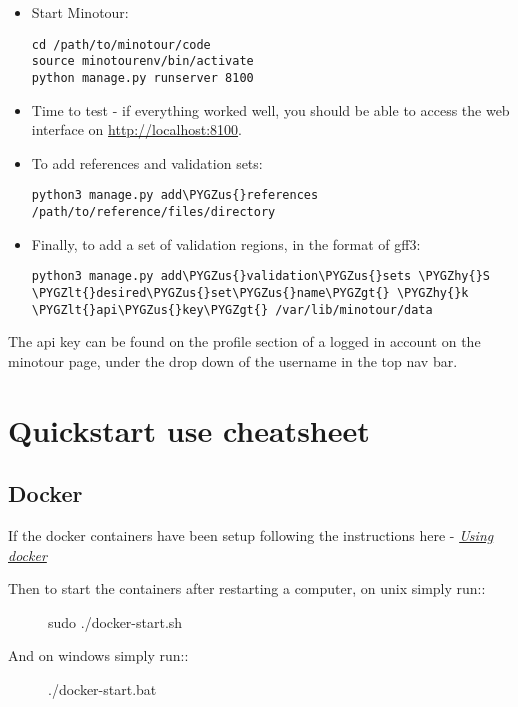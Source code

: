 \documentclass[letterpaper,10pt,english]{sphinxmanual}
\def\PYGZus{\char`\_}
\def\PYGZlt{\char`\<}
\def\PYGZgt{\char`\>}
\def\PYGZhy{\char`\-}
\begin{document}
\begin{itemize}
\item {} 
Start Minotour:

\begin{Verbatim}[commandchars=\\\{\}]
cd /path/to/minotour/code
source minotourenv/bin/activate
python manage.py runserver 8100
\end{Verbatim}

\item {} 
Time to test - if everything worked well, you should be able to access the web interface on \href{http://localhost:8100}{http://localhost:8100}.

\item {} 
To add references and validation sets:

\begin{Verbatim}[commandchars=\\\{\}]
python3 manage.py add\PYGZus{}references /path/to/reference/files/directory
\end{Verbatim}

\item {} 
Finally, to add a set of validation regions, in the format of gff3:

\begin{Verbatim}[commandchars=\\\{\}]
python3 manage.py add\PYGZus{}validation\PYGZus{}sets \PYGZhy{}S \PYGZlt{}desired\PYGZus{}set\PYGZus{}name\PYGZgt{} \PYGZhy{}k \PYGZlt{}api\PYGZus{}key\PYGZgt{} /var/lib/minotour/data
\end{Verbatim}

\end{itemize}

The api key can be found on the profile section of a logged in account on the minotour page, under the drop down of the username in the top nav bar.


\chapter{Quickstart use cheatsheet}
\label{quickstart::doc}\label{quickstart:quickstart-use-cheatsheet}

\section{Docker}
\label{quickstart:docker}
If the docker containers have been setup following the instructions here - {\hyperref[docker::doc]{\emph{\emph{Using docker}}}}
\begin{description}
\item[{Then to start the containers after restarting a computer, on unix simply run::}] \leavevmode
sudo ./docker-start.sh

\item[{And on windows simply run::}] \leavevmode
./docker-start.bat

\end{description}
\end{document}
